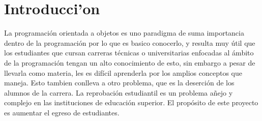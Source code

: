 \chapter{Introducci'on}

La programación orientada a objetos es uno paradigma de suma importancia dentro de la programación por lo que es basico conocerlo, y resulta muy útil que los estudiantes que cursan carreras técnicas o universitarias enfocadas al ámbito de la programación tengan un alto conocimiento de esto, sin embargo a pesar de llevarla como materia, les es difícil aprenderla por los amplios conceptos que maneja. Esto tambien conlleva a otro problema, que es la deserción de los alumnos de la carrera. La reprobación estudiantil es un problema añejo y complejo en las instituciones de educación superior. El propósito de este proyecto es aumentar el egreso de estudiantes.


